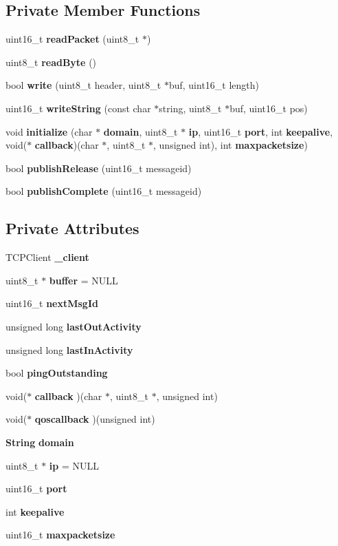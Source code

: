 \subsection*{Private Member Functions}
\begin{DoxyCompactItemize}
\item 
uint16\+\_\+t \textbf{ read\+Packet} (uint8\+\_\+t $\ast$)
\item 
uint8\+\_\+t \textbf{ read\+Byte} ()
\item 
bool \textbf{ write} (uint8\+\_\+t header, uint8\+\_\+t $\ast$buf, uint16\+\_\+t length)
\item 
uint16\+\_\+t \textbf{ write\+String} (const char $\ast$string, uint8\+\_\+t $\ast$buf, uint16\+\_\+t pos)
\item 
void \textbf{ initialize} (char $\ast$\textbf{ domain}, uint8\+\_\+t $\ast$\textbf{ ip}, uint16\+\_\+t \textbf{ port}, int \textbf{ keepalive}, void($\ast$\textbf{ callback})(char $\ast$, uint8\+\_\+t $\ast$, unsigned int), int \textbf{ maxpacketsize})
\item 
bool \textbf{ publish\+Release} (uint16\+\_\+t messageid)
\item 
bool \textbf{ publish\+Complete} (uint16\+\_\+t messageid)
\end{DoxyCompactItemize}
\subsection*{Private Attributes}
\begin{DoxyCompactItemize}
\item 
T\+C\+P\+Client \textbf{ \+\_\+client}
\item 
uint8\+\_\+t $\ast$ \textbf{ buffer} = N\+U\+LL
\item 
uint16\+\_\+t \textbf{ next\+Msg\+Id}
\item 
unsigned long \textbf{ last\+Out\+Activity}
\item 
unsigned long \textbf{ last\+In\+Activity}
\item 
bool \textbf{ ping\+Outstanding}
\item 
void($\ast$ \textbf{ callback} )(char $\ast$, uint8\+\_\+t $\ast$, unsigned int)
\item 
void($\ast$ \textbf{ qoscallback} )(unsigned int)
\item 
\textbf{ String} \textbf{ domain}
\item 
uint8\+\_\+t $\ast$ \textbf{ ip} = N\+U\+LL
\item 
uint16\+\_\+t \textbf{ port}
\item 
int \textbf{ keepalive}
\item 
uint16\+\_\+t \textbf{ maxpacketsize}
\end{DoxyCompactItemize}


